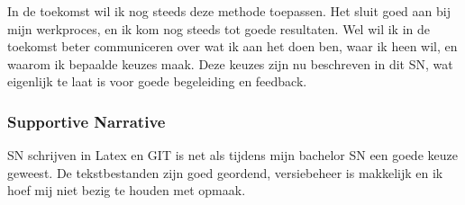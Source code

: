 In de toekomst wil ik nog steeds deze methode toepassen. Het sluit goed aan bij mijn werkproces, en ik kom nog steeds tot goede resultaten. Wel wil ik in de toekomst beter communiceren over wat ik aan het doen ben, waar ik heen wil, en waarom ik bepaalde keuzes maak. Deze keuzes zijn nu beschreven in dit SN, wat eigenlijk te laat is voor goede begeleiding en feedback.

\subsubsection*{Supportive Narrative}
\begin{todolist}
  \item SN schrijven in Latex en GIT is net als tijdens mijn bachelor SN een goede keuze geweest. De tekstbestanden zijn goed geordend, versiebeheer is makkelijk en ik hoef mij niet bezig te houden met opmaak.
\end{todolist}

